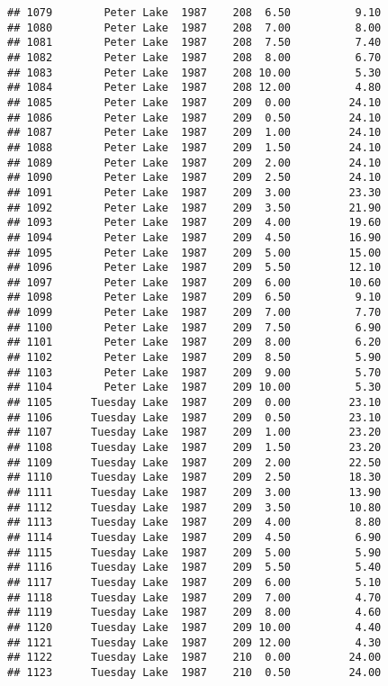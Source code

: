 \documentclass[
]{article}
\begin{document}
\begin{verbatim}
## 1079        Peter Lake  1987    208  6.50          9.10
## 1080        Peter Lake  1987    208  7.00          8.00
## 1081        Peter Lake  1987    208  7.50          7.40
## 1082        Peter Lake  1987    208  8.00          6.70
## 1083        Peter Lake  1987    208 10.00          5.30
## 1084        Peter Lake  1987    208 12.00          4.80
## 1085        Peter Lake  1987    209  0.00         24.10
## 1086        Peter Lake  1987    209  0.50         24.10
## 1087        Peter Lake  1987    209  1.00         24.10
## 1088        Peter Lake  1987    209  1.50         24.10
## 1089        Peter Lake  1987    209  2.00         24.10
## 1090        Peter Lake  1987    209  2.50         24.10
## 1091        Peter Lake  1987    209  3.00         23.30
## 1092        Peter Lake  1987    209  3.50         21.90
## 1093        Peter Lake  1987    209  4.00         19.60
## 1094        Peter Lake  1987    209  4.50         16.90
## 1095        Peter Lake  1987    209  5.00         15.00
## 1096        Peter Lake  1987    209  5.50         12.10
## 1097        Peter Lake  1987    209  6.00         10.60
## 1098        Peter Lake  1987    209  6.50          9.10
## 1099        Peter Lake  1987    209  7.00          7.70
## 1100        Peter Lake  1987    209  7.50          6.90
## 1101        Peter Lake  1987    209  8.00          6.20
## 1102        Peter Lake  1987    209  8.50          5.90
## 1103        Peter Lake  1987    209  9.00          5.70
## 1104        Peter Lake  1987    209 10.00          5.30
## 1105      Tuesday Lake  1987    209  0.00         23.10
## 1106      Tuesday Lake  1987    209  0.50         23.10
## 1107      Tuesday Lake  1987    209  1.00         23.20
## 1108      Tuesday Lake  1987    209  1.50         23.20
## 1109      Tuesday Lake  1987    209  2.00         22.50
## 1110      Tuesday Lake  1987    209  2.50         18.30
## 1111      Tuesday Lake  1987    209  3.00         13.90
## 1112      Tuesday Lake  1987    209  3.50         10.80
## 1113      Tuesday Lake  1987    209  4.00          8.80
## 1114      Tuesday Lake  1987    209  4.50          6.90
## 1115      Tuesday Lake  1987    209  5.00          5.90
## 1116      Tuesday Lake  1987    209  5.50          5.40
## 1117      Tuesday Lake  1987    209  6.00          5.10
## 1118      Tuesday Lake  1987    209  7.00          4.70
## 1119      Tuesday Lake  1987    209  8.00          4.60
## 1120      Tuesday Lake  1987    209 10.00          4.40
## 1121      Tuesday Lake  1987    209 12.00          4.30
## 1122      Tuesday Lake  1987    210  0.00         24.00
## 1123      Tuesday Lake  1987    210  0.50         24.00

\end{verbatim}
\end{document}
